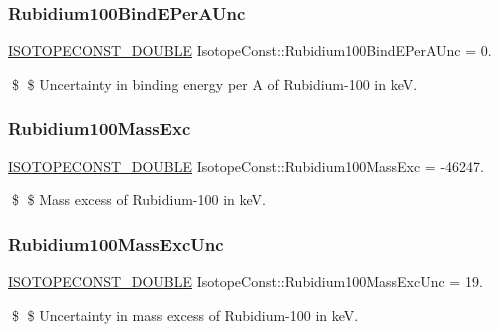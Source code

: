 \subsubsection{\texorpdfstring{Rubidium100\+Bind\+E\+Per\+A\+Unc}{Rubidium100BindEPerAUnc}}
{\footnotesize\ttfamily \mbox{\hyperlink{group___isotope_const-_macros_ga8f45a7272ce02c0b4c65c44636ed719a}{I\+S\+O\+T\+O\+P\+E\+C\+O\+N\+S\+T\+\_\+\+D\+O\+U\+B\+LE}} Isotope\+Const\+::\+Rubidium100\+Bind\+E\+Per\+A\+Unc = 0.}

\$ \$ Uncertainty in binding energy per A of Rubidium-\/100 in keV. \mbox{\label{group___isotope_const-_rubidium-_rb100_gad3b94660055064d7133682e265b2a6e1}} 
\subsubsection{\texorpdfstring{Rubidium100\+Mass\+Exc}{Rubidium100MassExc}}
{\footnotesize\ttfamily \mbox{\hyperlink{group___isotope_const-_macros_ga8f45a7272ce02c0b4c65c44636ed719a}{I\+S\+O\+T\+O\+P\+E\+C\+O\+N\+S\+T\+\_\+\+D\+O\+U\+B\+LE}} Isotope\+Const\+::\+Rubidium100\+Mass\+Exc = -\/46247.}

\$ \$ Mass excess of Rubidium-\/100 in keV. \mbox{\label{group___isotope_const-_rubidium-_rb100_ga053a92b2b62c74be3be68a2bcbc6abf5}} 
\subsubsection{\texorpdfstring{Rubidium100\+Mass\+Exc\+Unc}{Rubidium100MassExcUnc}}
{\footnotesize\ttfamily \mbox{\hyperlink{group___isotope_const-_macros_ga8f45a7272ce02c0b4c65c44636ed719a}{I\+S\+O\+T\+O\+P\+E\+C\+O\+N\+S\+T\+\_\+\+D\+O\+U\+B\+LE}} Isotope\+Const\+::\+Rubidium100\+Mass\+Exc\+Unc = 19.}

\$ \$ Uncertainty in mass excess of Rubidium-\/100 in keV. \mbox{\label{group___isotope_const-_rubidium-_rb100_gab7d978fa247a1fee24b8817621ad4763}} 
